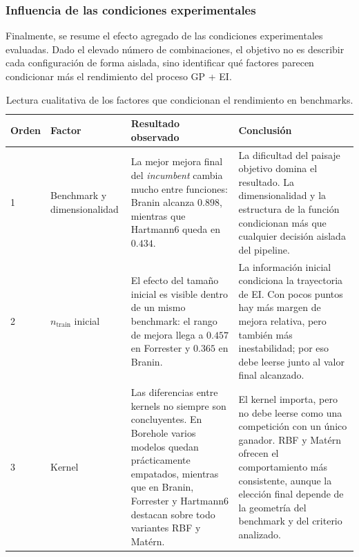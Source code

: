 \subsubsection{Influencia de las condiciones experimentales}
\label{subsubsec:influencia_condiciones_benchmarks}

Finalmente, se resume el efecto agregado de las condiciones experimentales evaluadas. Dado el elevado número de combinaciones, el objetivo no es describir cada configuración de forma aislada, sino identificar qué factores parecen condicionar más el rendimiento del proceso GP + EI.

\begin{table}[h]
  \centering
  \small
  \caption[Factores condicionantes en Benchmark]{Lectura cualitativa de los factores que condicionan el rendimiento en benchmarks.}
  \label{tab:jerarquia_factores_benchmark}
  \begin{tabularx}{\textwidth}{@{}p{0.8cm}p{2.7cm}XX@{}}
  \toprule
  \textbf{Orden} & \textbf{Factor} & \textbf{Resultado observado} & \textbf{Conclusión} \\
  \midrule

  1
  & Benchmark y dimensionalidad
  & La mejor mejora final del \emph{incumbent} cambia mucho entre funciones: Branin alcanza \(0.898\), mientras que Hartmann6 queda en \(0.434\).
  & La dificultad del paisaje objetivo domina el resultado. La dimensionalidad y la estructura de la función condicionan más que cualquier decisión aislada del
  pipeline. \\

  2
  & \(n_{\text{train}}\) inicial
  & El efecto del tamaño inicial es visible dentro de un mismo benchmark: el rango de mejora llega a \(0.457\) en Forrester y \(0.365\) en Branin.
  & La información inicial condiciona la trayectoria de EI. Con pocos puntos hay más margen de mejora relativa, pero también más inestabilidad; por eso debe leerse
  junto al valor final alcanzado. \\

  3
  & Kernel
  & Las diferencias entre kernels no siempre son concluyentes. En Borehole varios modelos quedan prácticamente empatados, mientras que en Branin, Forrester y Hartmann6 destacan sobre todo variantes RBF y Matérn.
  & El kernel importa, pero no debe leerse como una competición con un único ganador. RBF y Matérn ofrecen el comportamiento más consistente, aunque la elección final depende de la geometría del benchmark y del criterio analizado. \\


\end{tabularx}
\end{table}
